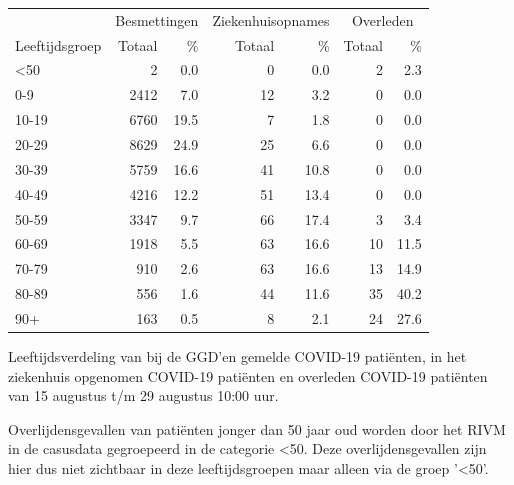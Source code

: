 \documentclass[
  english,
  man,floatsintext]{apa6}
\begin{document}
\begin{table}
\centering\begingroup\fontsize{11}{13}\selectfont

\begin{threeparttable}
\begin{tabular}{lrrrrrr}
\toprule
\multicolumn{1}{c}{ } & \multicolumn{2}{c}{Besmettingen} & \multicolumn{2}{c}{Ziekenhuisopnames} & \multicolumn{2}{c}{Overleden} \\
\cmidrule(l{3pt}r{3pt}){2-3} \cmidrule(l{3pt}r{3pt}){4-5} \cmidrule(l{3pt}r{3pt}){6-7}
Leeftijdsgroep & Totaal & \% & Totaal & \% & Totaal & \%\\
\midrule
<50 & 2 & 0.0 & 0 & 0.0 & 2 & 2.3\\
0-9 & 2412 & 7.0 & 12 & 3.2 & 0 & 0.0\\
10-19 & 6760 & 19.5 & 7 & 1.8 & 0 & 0.0\\
20-29 & 8629 & 24.9 & 25 & 6.6 & 0 & 0.0\\
30-39 & 5759 & 16.6 & 41 & 10.8 & 0 & 0.0\\
40-49 & 4216 & 12.2 & 51 & 13.4 & 0 & 0.0\\
50-59 & 3347 & 9.7 & 66 & 17.4 & 3 & 3.4\\
60-69 & 1918 & 5.5 & 63 & 16.6 & 10 & 11.5\\
70-79 & 910 & 2.6 & 63 & 16.6 & 13 & 14.9\\
80-89 & 556 & 1.6 & 44 & 11.6 & 35 & 40.2\\
90+ & 163 & 0.5 & 8 & 2.1 & 24 & 27.6\\
\bottomrule
\end{tabular}
\begin{tablenotes}
\item[1] Leeftijdsverdeling van bij de GGD’en gemelde COVID-19 patiënten, in het ziekenhuis opgenomen COVID-19 patiënten en overleden COVID-19 patiënten van 15 augustus t/m 29 augustus 10:00 uur.
\item[2] Overlijdensgevallen van patiënten jonger dan 50 jaar oud worden door het RIVM in de casusdata gegroepeerd in de categorie <50. Deze overlijdensgevallen zijn hier dus niet zichtbaar in deze leeftijdsgroepen maar alleen via de groep '<50'.
\end{tablenotes}
\end{threeparttable}
\endgroup{}
\end{table}

\newpage
\end{document}

